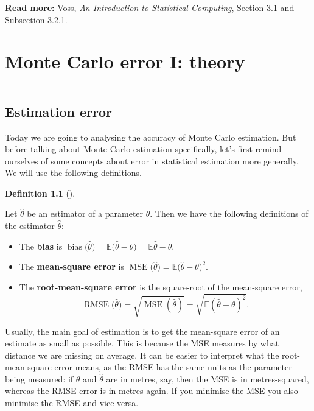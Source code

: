 \documentclass[
  letterpaper,
  DIV=11,
  numbers=noendperiod]{scrreprt}
\theoremstyle{plain}
\theoremstyle{definition}
\newtheorem{definition}{Definition}[chapter]
\theoremstyle{definition}
\theoremstyle{remark}
\begin{document}
\textbf{Read more:}
\href{https://leeds.primo.exlibrisgroup.com/permalink/44LEE_INST/1fj430b/cdi_askewsholts_vlebooks_9781118728031}{Voss,
\emph{An Introduction to Statistical Computing}}, Section 3.1 and
Subsection 3.2.1.

\chapter{Monte Carlo error I: theory}\label{monte-carlo-error-i-theory}

\[ \]

\section{Estimation error}\label{estimation-error}

Today we are going to analysing the accuracy of Monte Carlo estimation.
But before talking about Monte Carlo estimation specifically, let's
first remind ourselves of some concepts about error in statistical
estimation more generally. We will use the following definitions.

\begin{definition}[]\protect\hypertarget{def-stats}{}\label{def-stats}

Let \(\widehat\theta\) be an estimator of a parameter \(\theta\). Then
we have the following definitions of the estimator \(\widehat\theta\):

\begin{itemize}
\item
  The \textbf{bias} is
  \(\operatorname{bias}\big(\widehat\theta\big) = \mathbb E\big(\widehat\theta - \theta\big)  = \mathbb E\widehat\theta - \theta\).
\item
  The \textbf{mean-square error} is
  \(\operatorname{MSE}\big(\widehat\theta\big) = \mathbb E \big(\widehat\theta - \theta\big)^2\).
\item
  The \textbf{root-mean-square error} is the square-root of the
  mean-square error,
  \[\operatorname{RMSE}\big(\widehat\theta\big) = \sqrt{\operatorname{MSE}(\widehat\theta)} = \sqrt{\mathbb E (\widehat\theta - \theta)^2} . \]
\end{itemize}

\end{definition}

Usually, the main goal of estimation is to get the mean-square error of
an estimate as small as possible. This is because the MSE measures by
what distance we are missing on average. It can be easier to interpret
what the root-mean-square error means, as the RMSE has the same units as
the parameter being measured: if \(\theta\) and \(\widehat{\theta}\) are
in metres, say, then the MSE is in metres-squared, whereas the RMSE
error is in metres again. If you minimise the MSE you also minimise the
RMSE and vice versa.
\end{document}
